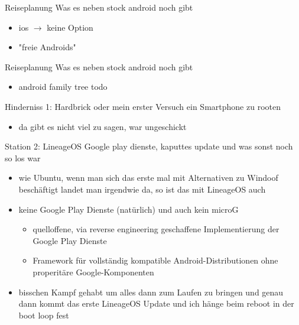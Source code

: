 \documentclass[14pt,compress,usenames,dvipsnames,aspectratio=169]{beamer}
\begin{document}
\begin{frame}{Reiseplanung}
    Was es neben stock android noch gibt
    \begin{itemize}
        \item ios $\to$ keine Option
        \item "freie Androids"
    \end{itemize}
\end{frame}

\begin{frame}{Reiseplanung}
    Was es neben stock android noch gibt
    \begin{itemize}
        \item android family tree todo
    \end{itemize}
\end{frame}

\begin{frame}{Hinderniss 1: Hardbrick}
    oder mein erster Versuch ein Smartphone zu rooten
    \begin{itemize}
        \item da gibt es nicht viel zu sagen, war ungeschickt
    \end{itemize}
\end{frame}

\begin{frame}{Station 2: LineageOS}
    Google play dienste, kaputtes update und was sonst noch so los war
    \begin{itemize}
        \item wie Ubuntu, wenn man sich das erste mal mit Alternativen zu Windoof beschäftigt landet man irgendwie da, so ist das mit LineageOS auch 
        \item keine Google Play Dienste (natürlich) und auch kein microG
        \begin{itemize}
            \item quelloffene, via reverse engineering geschaffene Implementierung der Google Play Dienste 
            \item Framework für vollständig kompatible Android-Distributionen ohne properitäre Google-Komponenten
        \end{itemize}
        \item bisschen Kampf gehabt um alles dann zum Laufen zu bringen und genau dann kommt das erste LineageOS Update und ich hänge beim reboot in der boot loop fest
    \end{itemize}
\end{frame}
\end{document}
